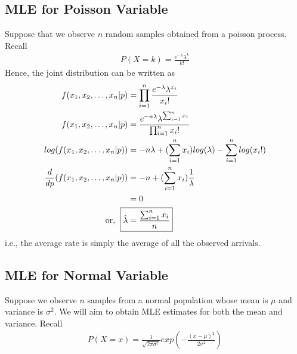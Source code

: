 \documentclass[../probability-notes.tex]{subfiles}
\begin{document}
    \subsection{MLE for Poisson Variable}
    Suppose that we observe $n$ random samples obtained from a poisson process. Recall
    \begin{align*}
        P(X = k) = \frac{e^{-\lambda} \lambda^{k}}{k!}
    \end{align*}
    Hence, the joint distribution can be written as
    \begin{align*}
        f(x_{1}, x_{2}, \ldots, x_{n}|p) &= \prod_{i=1}^{n} \frac{e^{-\lambda} \lambda^{x_{i}}}{x_{i}!}\\
        f(x_{1}, x_{2}, \ldots, x_{n}|p) &= \frac{e^{-n\lambda} \lambda^{\sum_{i=1}^{n} x_{i}}}{\prod_{i=1}^{n} x_{i}!}\\
        log(f(x_{1}, x_{2}, \ldots, x_{n}|p)) &= -n\lambda + (\sum_{i=1}^{n} x_{i})log(\lambda) - \sum_{i=1}^{n} log(x_{i}!)\\
        \frac{d}{dp}(f(x_{1}, x_{2}, \ldots, x_{n}|p)) &= -n + (\sum_{i=1}^{n} x_{i})\frac{1}{\lambda}\\
        &= 0\\
        \text{or, \;} \Aboxed{\hat{\lambda} &= \frac{\sum_{i=1}^{n} x_{i}}{n}}
    \end{align*}
    i.e., the average rate is simply the average of all the observed arrivals.


    \subsection{MLE for Normal Variable}
    Suppose we observe $n$ samples from a normal population whose mean is $\mu$ and variance is $\sigma^{2}$. We will aim to obtain MLE estimates for both the mean and variance. Recall
    \begin{align*}
         P(X = x) = \frac{1}{\sqrt{2 \pi \sigma^{2}}} exp(-\frac{(x-\mu)^{2}}{2\sigma^{2}})
    \end{align*}
\end{document}
